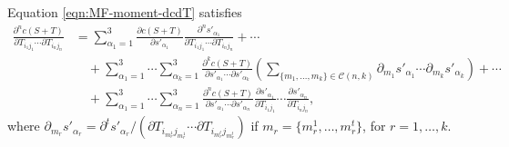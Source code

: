 \begin{theorem}
	Equation \eqref{eqn:MF-moment-dcdT} satisfies
	\begin{align} \label{eqn:MF-moment-dcdTExpand}
		\frac{\partial^n c(S+T)}{\partial T_{i_1j_1} \cdots \partial T_{i_nj_n}} &= \sum_{\alpha_1=1}^{3} \frac{\partial c(S+T)}{\partial s'_{\alpha_1}} \frac{\partial^n s'_{\alpha_1}}{\partial T_{i_1j_1} \cdots \partial T_{i_nj_n}} + \cdots \nonumber \\
		&\quad + \sum_{\alpha_1=1}^{3}\cdots\sum_{\alpha_k=1}^{3} \frac{\partial^k c(S+T)}{\partial s'_{\alpha_1} \cdots \partial s'_{\alpha_k}} \left( \sum_{\{m_1,\ldots,m_k\}\in\mathcal{C}(n,k)} \partial_{m_1}s'_{\alpha_1} \cdots \partial_{m_k}s'_{\alpha_k} \right) + \cdots \nonumber \\
		&\quad + \sum_{\alpha_1=1}^{3}\cdots\sum_{\alpha_n=1}^{3} \frac{\partial^n c(S+T)}{\partial s'_{\alpha_1}\cdots\partial s'_{\alpha_n}} \frac{\partial s'_{\alpha_1}}{\partial T_{i_1j_1}} \cdots \frac{\partial s'_{\alpha_n}}{\partial T_{i_nj_n}},
	\end{align}
	where $\partial_{m_r}s'_{\alpha_r} = \partial^t s'_{\alpha_r} / \left(\partial T_{i_{m_r^1}j_{m_r^1}} \cdots \partial T_{i_{m_r^t}j_{m_r^t}} \right)$ if $m_r = \{m_r^1,\ldots,m_r^t\}$, for $r = 1,\ldots,k$.
\end{theorem}
